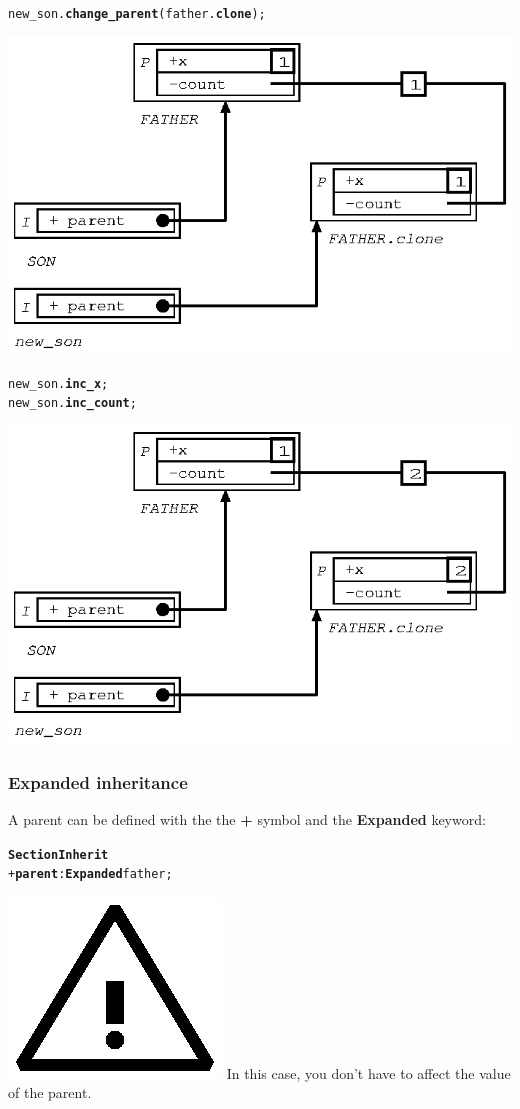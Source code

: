 \documentclass[11pt]{mybook}
\newcommand{\warning}{\includegraphics[scale=0.3]{figures/warning}}
\begin{document}
\begin{alltt}
  new\_son.{\bf{}change\_parent} ({\sc{}father}.{\bf{}clone});
\end{alltt}
\begin{center}
\includegraphics[scale=1.0]{figures/inherit_plus_3} 
\end{center}

\begin{alltt}
  new\_son.{\bf{}inc\_x};
  new\_son.{\bf{}inc\_count};
\end{alltt}
\begin{center}
\includegraphics[scale=1.0]{figures/inherit_plus_4} 
\end{center}
\subsubsection{Expanded inheritance}
\label{language_reference:section_identifiers:inherit_section:expanded_inheritance}
%
A parent can be defined with the the {\bf{} +} symbol and the {\bf{}Expanded} keyword:
\begin{alltt}
{\bf{}Section Inherit}
  + {\bf{} parent}:{\bf{}Expanded} {\sc{}father};
\end{alltt}
\warning{} In this case, you don't have to affect the value of the parent.
\end{document}

